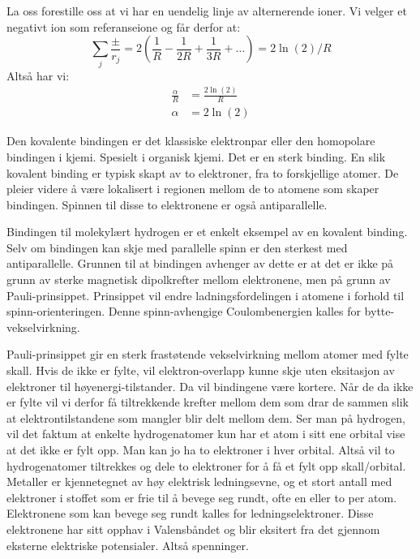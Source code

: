 \documentclass{article}
\begin{document}
\begin{tcolorbox}[breakable,boxrule=0pt]
    La oss forestille oss at vi har en uendelig linje av alternerende ioner. Vi velger et negativt ion som referanseione og får derfor at:
    \begin{equation*}
        \sum_j \frac{\pm}{r_j} = 2\left( \frac{1}{R} - \frac{1}{2R} + \frac{1}{3R} + \dots\right) = 2 \ln(2) / R
    \end{equation*}
    Altså har vi:
    \begin{align*}
        \frac{\alpha}{R} &= \frac{2\ln(2)}{R} \\
        \alpha &= 2 \ln(2)
    \end{align*}
\end{tcolorbox}

Den kovalente bindingen er det klassiske elektronpar eller den homopolare bindingen i kjemi. Spesielt i organisk kjemi. Det er en sterk binding. En slik kovalent binding er  typisk skapt av to elektroner, fra to forskjellige atomer. De pleier videre å være lokalisert i regionen mellom de to atomene som skaper bindingen. Spinnen til disse to elektronene er også antiparallelle.

Bindingen til molekylært hydrogen er et enkelt eksempel av en kovalent binding. Selv om bindingen kan skje med parallelle spinn er den sterkest med antiparallelle. Grunnen til at bindingen avhenger av dette er at det er ikke på grunn av sterke magnetisk dipolkrefter mellom elektronene, men på grunn av Pauli-prinsippet. Prinsippet vil endre ladningsfordelingen i atomene i forhold til spinn-orienteringen. Denne spinn-avhengige Coulombenergien kalles for bytte-vekselvirkning.

Pauli-prinsippet gir en sterk frastøtende vekselvirkning mellom atomer med fylte skall. Hvis de ikke er fylte, vil elektron-overlapp kunne skje uten eksitasjon av elektroner til høyenergi-tilstander. Da vil bindingene være kortere. Når de da ikke er fylte vil vi derfor få tiltrekkende krefter mellom dem som drar de sammen slik at elektrontilstandene som mangler blir delt mellom dem. Ser man på hydrogen, vil det faktum at enkelte hydrogenatomer kun har et atom i sitt ene orbital vise at det ikke er fylt opp. Man kan jo ha to elektroner i hver orbital. Altså vil to hydrogenatomer tiltrekkes og dele to elektroner for å få et fylt opp skall/orbital.
Metaller er kjennetegnet av høy elektrisk ledningsevne, og et stort antall med elektroner i stoffet som er frie til å bevege seg rundt, ofte  en eller to per atom. Elektronene som kan bevege seg rundt kalles for ledningselektroner. Disse elektronene har sitt opphav i Valensbåndet og blir eksitert fra det gjennom eksterne elektriske potensialer. Altså spenninger. 
\end{document}
